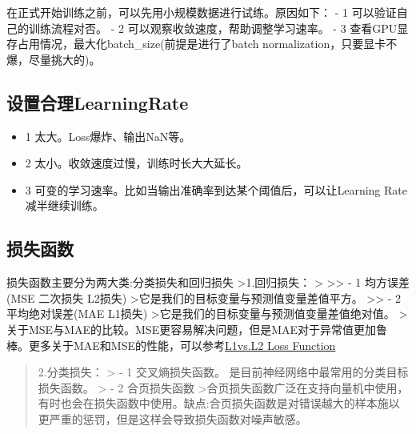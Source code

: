 在正式开始训练之前，可以先用小规模数据进行试练。原因如下： - 1
可以验证自己的训练流程对否。 - 2 可以观察收敛速度，帮助调整学习速率。 -
3 查看GPU显存占用情况，最大化batch\_size(前提是进行了batch
normalization，只要显卡不爆，尽量挑大的)。

\subsection{设置合理LearningRate}\label{ux8bbeux7f6eux5408ux7406learning-rate}

\begin{itemize}
\item
  1 太大。Loss爆炸、输出NaN等。
\item
  2 太小。收敛速度过慢，训练时长大大延长。
\item
  3 可变的学习速率。比如当输出准确率到达某个阈值后，可以让Learning
  Rate减半继续训练。
\end{itemize}

\subsection{损失函数}\label{ux635fux5931ux51fdux6570}

损失函数主要分为两大类:分类损失和回归损失 \textgreater{}1.回归损失：
\textgreater{} \textgreater{}\textgreater{} - 1 均方误差(MSE 二次损失
L2损失) \textgreater{}它是我们的目标变量与预测值变量差值平方。
\textgreater{}\textgreater{} - 2 平均绝对误差(MAE L1损失)
\textgreater{}它是我们的目标变量与预测值变量差值绝对值。
\textgreater{}关于MSE与MAE的比较。MSE更容易解决问题，但是MAE对于异常值更加鲁棒。更多关于MAE和MSE的性能，可以参考\href{https://rishy.github.io/ml/2015/07/28/l1-vs-l2-loss/}{L1vs.L2
Loss Function}

\begin{quote}
2.分类损失： \textgreater{} - 1 交叉熵损失函数。
是目前神经网络中最常用的分类目标损失函数。 \textgreater{} - 2
合页损失函数
\textgreater{}合页损失函数广泛在支持向量机中使用，有时也会在损失函数中使用。缺点:合页损失函数是对错误越大的样本施以更严重的惩罚，但是这样会导致损失函数对噪声敏感。
\end{quote}
